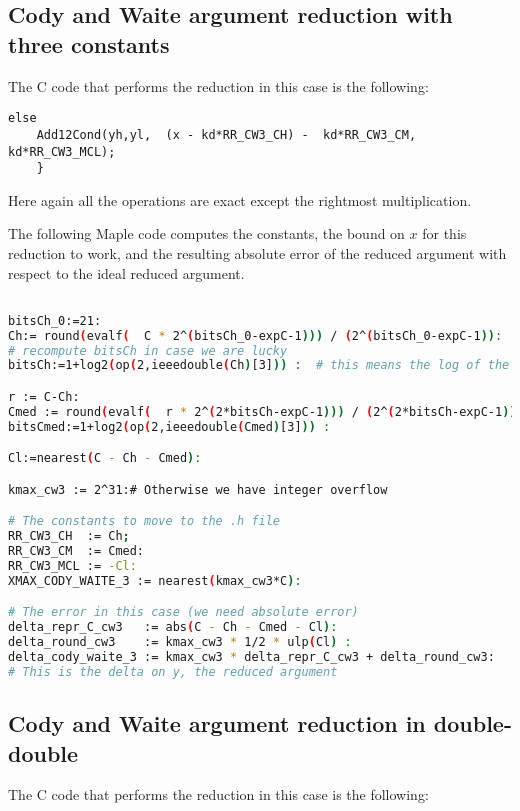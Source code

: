 \subsection{Cody and Waite argument reduction with three constants}
The C code that performs the reduction in this case is the following:

\begin{lstlisting}[caption={Cody and Waite argument reduction with three 
    constants},firstnumber=1]
      else 
	Add12Cond(yh,yl,  (x - kd*RR_CW3_CH) -  kd*RR_CW3_CM,   kd*RR_CW3_MCL);
    }
\end{lstlisting}

Here again all the operations are exact except the rightmost multiplication. 

The following Maple code computes the constants, the bound on $x$ for
this reduction to work, and the resulting absolute error of the reduced
argument with respect to the ideal reduced argument.

\begin{lstlisting}[caption={Computing constants for Cody and Waite 3},
  firstnumber=1,  language={sh}]% of course it's maple
%Skip a line here, I don't know why, otherwise latex eats the first line

bitsCh_0:=21:
Ch:= round(evalf(  C * 2^(bitsCh_0-expC-1))) / (2^(bitsCh_0-expC-1)):
# recompute bitsCh in case we are lucky
bitsCh:=1+log2(op(2,ieeedouble(Ch)[3])) :  # this means the log of the denominator

r := C-Ch:
Cmed := round(evalf(  r * 2^(2*bitsCh-expC-1))) / (2^(2*bitsCh-expC-1)):
bitsCmed:=1+log2(op(2,ieeedouble(Cmed)[3])) :

Cl:=nearest(C - Ch - Cmed):

kmax_cw3 := 2^31:# Otherwise we have integer overflow

# The constants to move to the .h file
RR_CW3_CH  := Ch;
RR_CW3_CM  := Cmed:
RR_CW3_MCL := -Cl:
XMAX_CODY_WAITE_3 := nearest(kmax_cw3*C):

# The error in this case (we need absolute error)
delta_repr_C_cw3   := abs(C - Ch - Cmed - Cl):
delta_round_cw3    := kmax_cw3 * 1/2 * ulp(Cl) :
delta_cody_waite_3 := kmax_cw3 * delta_repr_C_cw3 + delta_round_cw3:
# This is the delta on y, the reduced argument
\end{lstlisting}

\subsection{Cody and Waite argument reduction in double-double}
The C code that performs the reduction in this case is the following:

